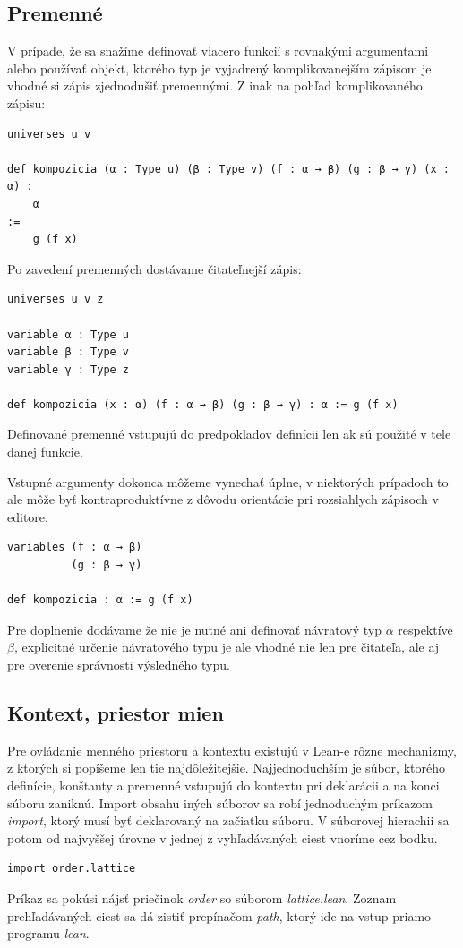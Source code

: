 \documentclass[a4paper,10pt,oneside]{report}%
\begin{document}
\subsection{Premenné}
    V prípade, že sa snažíme definovať viacero funkcií s rovnakými argumentami alebo
používať objekt, ktorého typ je vyjadrený komplikovanejším zápisom je vhodné si
zápis zjednodušiť premennými.
    Z inak na pohľad komplikovaného zápisu:
\begin{lstlisting}
universes u v

def kompozicia (α : Type u) (β : Type v) (f : α → β) (g : β → γ) (x : α) :
    α
:=
    g (f x)
\end{lstlisting}
    Po zavedení premenných dostávame čitateľnejší zápis:
\begin{lstlisting}
universes u v z

variable α : Type u
variable β : Type v
variable γ : Type z

def kompozicia (x : α) (f : α → β) (g : β → γ) : α := g (f x)
\end{lstlisting}
    Definované premenné vstupujú do predpokladov definícii len ak sú použité v tele
danej funkcie.

    Vstupné argumenty dokonca môžeme vynechať úplne, v niektorých prípadoch to ale
môže byť kontraproduktívne z dôvodu orientácie pri rozsiahlych zápisoch v editore.
\begin{lstlisting}
variables (f : α → β)
          (g : β → γ)

def kompozicia : α := g (f x)
\end{lstlisting}
Pre doplnenie dodávame že nie je nutné ani definovať návratový typ $\alpha$
    respektíve $\beta$, explicitné určenie návratového typu je ale vhodné nie len
    pre čitateľa, ale aj pre overenie správnosti výsledného typu.
\subsection{Kontext, priestor mien}
    Pre ovládanie menného priestoru a kontextu existujú v Lean-e rôzne mechanizmy,
z ktorých si popíšeme len tie najdôležitejšie.
    Najjednoduchším je súbor, ktorého definície, konštanty a premenné vstupujú do
kontextu pri deklarácii a na konci súboru zaniknú.
    Import obsahu iných súborov sa robí jednoduchým príkazom \emph{import}, ktorý
musí byť deklarovaný na začiatku súboru. V súborovej hierachii sa potom od najvyššej
úrovne v jednej z vyhľadávaných ciest vnoríme cez bodku.
\begin{lstlisting}
import order.lattice
\end{lstlisting}
    Príkaz sa pokúsi nájsť priečinok \emph{order} so súborom \emph{lattice.lean}.
    Zoznam prehľadávaných ciest sa dá zistiť prepínačom \emph{path}, ktorý ide na 
vstup priamo programu \emph{lean}.
\end{document}
